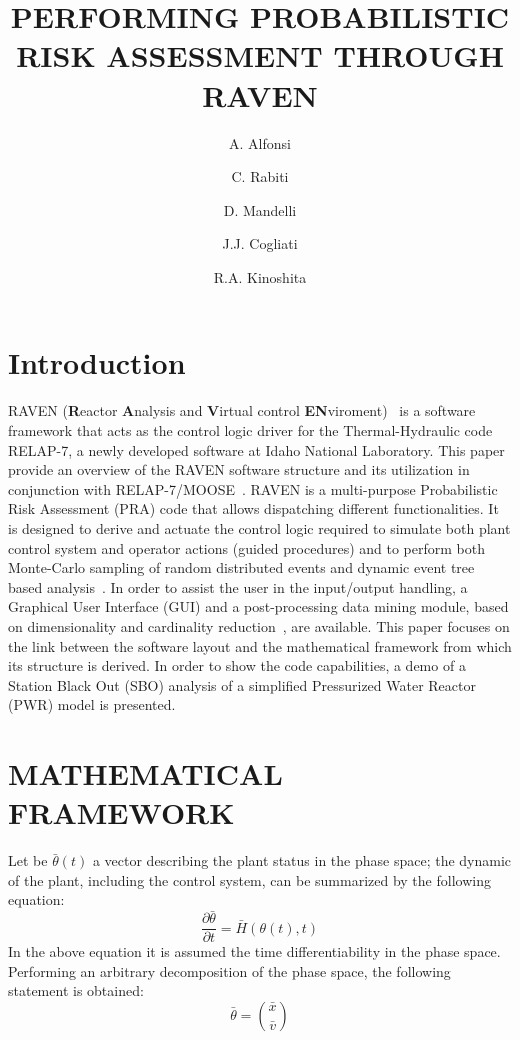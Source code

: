 \documentclass{anstrans}
\title{PERFORMING PROBABILISTIC RISK ASSESSMENT THROUGH RAVEN}
\author{A. Alfonsi \and  C. Rabiti \and D. Mandelli \and J.J. Cogliati \and R.A. Kinoshita}
\institute{
Idaho National Laboratory
}
\begin{document}
  \twocolumn[
    \begin{@twocolumnfalse}
        \maketitle
    \end{@twocolumnfalse}
  ]

\section{Introduction}
RAVEN (\textbf{R}eactor \textbf{A}nalysis and \textbf{V}irtual control \textbf{EN}viroment)~\cite{ravenFY12,mandelliANS2012} is a software framework that acts as the control logic driver for the Thermal-Hydraulic code RELAP-7, a newly developed software at Idaho National Laboratory. This paper provide an overview of the RAVEN software structure and its utilization in conjunction with RELAP-7/MOOSE~\cite{MOOSE,relap7FY12}. RAVEN is a multi-purpose Probabilistic Risk Assessment (PRA) code that allows dispatching different functionalities. 
It is designed to derive and actuate the control logic required to simulate both plant control system and operator actions (guided procedures) and to perform both Monte-Carlo sampling of random distributed events and dynamic event tree based analysis~\cite{ADAPTHakobyan}. 
In order to assist the user in the input/output handling, a Graphical User Interface (GUI) and a post-processing data mining module, based on dimensionality and cardinality reduction~\cite{mandelliEsrel2011}, are available.
This paper focuses on the link between the software layout and the mathematical framework from which its structure is derived. In order to show the code capabilities, a demo of a Station Black Out (SBO) analysis of a simplified Pressurized Water Reactor (PWR) model is presented.
\section{MATHEMATICAL FRAMEWORK}
\label{sec:mathFramework}
Let be $\bar{\theta}(t)$ a vector describing the plant status in the phase space; the dynamic of the plant, including the control system, can be summarized by the following equation:
\begin{equation}
\frac{\partial \bar{\theta}}{\partial t} = \bar{H}(\theta(t),t)
\label{eq:SystemDynamics}
\end{equation}
In the above equation it is assumed the time differentiability in the phase space. Performing an arbitrary decomposition of the phase space, the following statement is obtained:
\begin{equation}
\bar{\theta}=\binom{\bar{x}}{\bar{v}}
\label{eq:firstDecomposition}
\end{equation}
\end{document}
